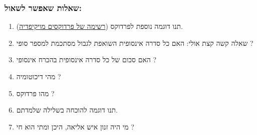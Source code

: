 \subsubsection*{שאלות שאפשר לשאול:}
\begin{enumerate}[itemsep=-2pt, itemindent=2.5em]
\item תנו דוגמה נוספת לפרדוקס \hypersetup{urlcolor=blue}
\label{https://he.wikipedia.org/wiki/זנון_מאליאה}
(\href{https://he.wikipedia.org/wiki/זנון_מאליאה}{רשימה  של פרדוקסים מויקיפדיה}).
\item שאלה קשה קצת אולי: האם כל סדרה אינסופית השואפת לגבול מסתכמת למספר סופי ?
\item האם סכום של כל סדרה אינסופית בהכרח אינסופי ?
\item מהי דיכוטומיה ?
\item מהו פרדוקס ?
\item תנו דוגמה להוכחה בשלילה שלמדתם.
\item מי היה זנון איש אליאה, היכן ומתי הוא חי ?
\end{enumerate}

